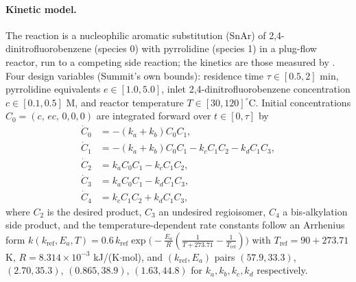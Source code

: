 \documentclass[11pt]{article}
\begin{document}
\paragraph{Kinetic model.} The reaction is a nucleophilic aromatic
substitution (SnAr) of 2,4-dinitrofluorobenzene (species 0) with
pyrrolidine (species 1) in a plug-flow reactor, run to a competing
side reaction; the kinetics are those measured by
\citet{hone2017snar}. Four design variables (Summit's own bounds):
residence time $\tau \in [0.5, 2]$ min, pyrrolidine equivalents
$e \in [1.0, 5.0]$, inlet 2,4-dinitrofluorobenzene concentration
$c \in [0.1, 0.5]$ M, and reactor temperature $T \in [30, 120]^\circ$C.
Initial concentrations $C_0 = (c,\, ec,\, 0, 0, 0)$ are integrated
forward over $t \in [0, \tau]$ by
\begin{align*}
\dot C_0 &= -(k_a+k_b) C_0 C_1, \\
\dot C_1 &= -(k_a+k_b) C_0 C_1 - k_c C_1 C_2 - k_d C_1 C_3, \\
\dot C_2 &= k_a C_0 C_1 - k_c C_1 C_2, \\
\dot C_3 &= k_a C_0 C_1 - k_d C_1 C_3, \\
\dot C_4 &= k_c C_1 C_2 + k_d C_1 C_3,
\end{align*}
where $C_2$ is the desired product, $C_3$ an undesired regioisomer,
$C_4$ a bis-alkylation side product, and the temperature-dependent
rate constants follow an Arrhenius form
$k(k_{\mathrm{ref}}, E_a, T) = 0.6\, k_{\mathrm{ref}}
\exp\!\big(-\tfrac{E_a}{R}(\tfrac{1}{T+273.71} - \tfrac{1}{T_{\mathrm{ref}}})\big)$
with $T_{\mathrm{ref}} = 90 + 273.71$ K, $R = 8.314\times10^{-3}$
kJ/(K$\cdot$mol), and $(k_{\mathrm{ref}}, E_a)$ pairs
$(57.9, 33.3)$, $(2.70, 35.3)$, $(0.865, 38.9)$, $(1.63, 44.8)$ for
$k_a, k_b, k_c, k_d$ respectively.
\end{document}
